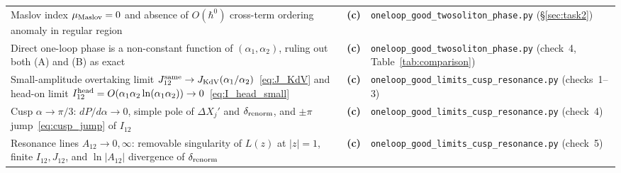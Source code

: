 \documentclass[11pt,a4paper]{article}
\newcommand{\Lc}{\textsf{\textbf{(c)}}}
\theoremstyle{remark}
\begin{document}
\begin{center}
\begin{tabular}{@{}>{\raggedright\arraybackslash}p{6.9cm}c>{\raggedright\arraybackslash}p{6.5cm}@{}}
Maslov index $\mu_{\rm Maslov}=0$ and absence of $O(\hbar^0)$ cross-term ordering anomaly in regular region & \Lc & \texttt{oneloop\_good\_twosoliton\_phase.py} (\S\ref{sec:task2})\\
Direct one-loop phase is a non-constant function of $(\alpha_1,\alpha_2)$, ruling out both (A) and (B) as exact & \Lc & \texttt{oneloop\_good\_twosoliton\_phase.py} (check~4, Table~\ref{tab:comparison})\\
Small-amplitude overtaking limit $J_{12}^{\rm same}\to J_{\rm KdV}(\alpha_1/\alpha_2)$~\eqref{eq:J_KdV} and head-on limit $I_{12}^{\rm head}=O(\alpha_1\alpha_2\ln(\alpha_1\alpha_2))\to 0$~\eqref{eq:I_head_small} & \Lc & \texttt{oneloop\_good\_limits\_cusp\_resonance.py} (checks~1--3)\\
Cusp $\alpha\to\pi/3$: $dP/d\alpha\to 0$, simple pole of $\Delta X_j'$ and $\delta_{\rm renorm}$, and $\pm\pi$ jump~\eqref{eq:cusp_jump} of $I_{12}$ & \Lc & \texttt{oneloop\_good\_limits\_cusp\_resonance.py} (check~4)\\
Resonance lines $A_{12}\to 0,\infty$: removable singularity of $L(z)$ at $|z|=1$, finite $I_{12},J_{12}$, and $\ln|A_{12}|$ divergence of $\delta_{\rm renorm}$ & \Lc & \texttt{oneloop\_good\_limits\_cusp\_resonance.py} (check~5)\\\bottomrule
\end{tabular}
\end{center}
\end{document}
